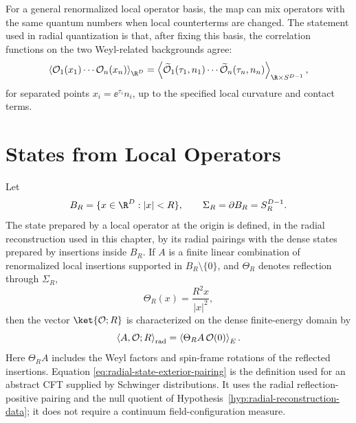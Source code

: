 For a general renormalized local operator basis, the map can mix operators
with the same quantum numbers when local counterterms are changed.  The
statement used in radial quantization is that, after fixing this basis, the
correlation functions on the two Weyl-related backgrounds agree:
\begin{equation}
  \left\langle
    \mathcal O_1(x_1)\cdots\mathcal O_n(x_n)
  \right\rangle_{\R^D}
  =
  \left\langle
    \widetilde{\mathcal O}_1(\tau_1,n_1)\cdots
    \widetilde{\mathcal O}_n(\tau_n,n_n)
  \right\rangle_{\R\times S^{D-1}},
  \label{eq:cylinder-flat-correlator-equivalence}
\end{equation}
for separated points \(x_i=\ee^{\tau_i}n_i\), up to the specified local
curvature and contact terms.

\section{States from Local Operators}

Let
\[
  B_R=\{x\in\R^D:|x|<R\},
  \qquad
  \Sigma_R=\partial B_R=S_R^{D-1}.
\]
The state prepared by a local operator at the origin is defined, in the
radial reconstruction used in this chapter, by its radial pairings with the
dense states prepared by insertions inside \(B_R\).  If \(A\) is a finite
linear combination of renormalized local insertions supported in
\(B_R\setminus\{0\}\), and \(\Theta_R\) denotes reflection through
\(\Sigma_R\),
\[
  \Theta_R(x)=\frac{R^2x}{|x|^2},
\]
then the vector \(\ket{\mathcal O;R}\) is characterized on the dense
finite-energy domain by
\begin{equation}
  \left\langle A,\mathcal O;R\right\rangle_{\rm rad}
  =
  \left\langle
    \Theta_R A\,\mathcal O(0)
  \right\rangle_E .
  \label{eq:radial-state-exterior-pairing}
\end{equation}
Here \(\Theta_RA\) includes the Weyl factors and spin-frame rotations of the
reflected insertions.  Equation
\eqref{eq:radial-state-exterior-pairing} is the definition used for an
abstract CFT supplied by Schwinger distributions.  It uses the radial
reflection-positive pairing and the null quotient of
Hypothesis~\ref{hyp:radial-reconstruction-data}; it does not require a
continuum field-configuration measure.

